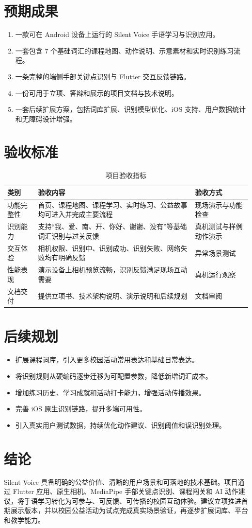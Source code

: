 \documentclass[UTF8,a4paper,12pt]{ctexart}
\newcommand{\projectname}{Silent Voice}
\begin{document}
\section{预期成果}

\begin{enumerate}
  \item 一款可在 Android 设备上运行的 \projectname{} 手语学习与识别应用。
  \item 一套包含 7 个基础词汇的课程地图、动作说明、示意素材和实时识别练习流程。
  \item 一条完整的端侧手部关键点识别与 Flutter 交互反馈链路。
  \item 一份可用于立项、答辩和展示的项目文档与技术说明。
  \item 一套后续扩展方案，包括词库扩展、识别模型优化、iOS 支持、用户数据统计和无障碍设计增强。
\end{enumerate}

\section{验收标准}

\begin{table}[htbp]
\centering
\caption{项目验收指标}
\begin{tabularx}{\textwidth}{p{3cm}Y p{3.2cm}}
\toprule
类别 & 验收内容 & 验收方式 \\
\midrule
功能完整性 & 首页、课程地图、课程学习、实时练习、公益故事均可进入并完成主要流程 & 现场演示与功能检查 \\
识别能力 & 支持“我、爱、南、开、你好、谢谢、没有”等基础词汇识别与过关反馈 & 真机测试与样例动作演示 \\
交互体验 & 相机权限、识别中、识别成功、识别失败、网络失败均有明确反馈 & 异常场景测试 \\
性能表现 & 演示设备上相机预览流畅，识别反馈满足现场互动需要 & 真机运行观察 \\
文档交付 & 提供立项书、技术架构说明、演示说明和后续规划 & 文档审阅 \\
\bottomrule
\end{tabularx}
\end{table}

\section{后续规划}

\begin{itemize}
  \item 扩展课程词库，引入更多校园活动常用表达和基础日常表达。
  \item 将识别规则从硬编码逐步迁移为可配置参数，降低新增词汇成本。
  \item 增加练习历史、学习成就和活动打卡能力，增强活动传播效果。
  \item 完善 iOS 原生识别链路，提升多端可用性。
  \item 引入真实用户测试数据，持续优化动作建议、识别阈值和误识别处理。
\end{itemize}

\section{结论}

\projectname{} 具备明确的公益价值、清晰的用户场景和可落地的技术基础。项目通过 Flutter 应用、原生相机、MediaPipe 手部关键点识别、课程闯关和 AI 动作建议，将手语学习转化为可参与、可反馈、可传播的校园互动体验。建议立项推进首期展示版本，并以校园公益活动为试点完成真实场景验证，再逐步扩展词库、平台和教学能力。
\end{document}

